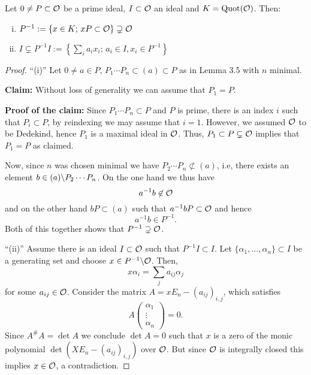 \begin{Lem}
	Let $0 \neq P \subset \mathcal{O}$ be a prime ideal, $I \subset \mathcal{O}$ an ideal and $K=\operatorname{Quot}(\mathcal{O})$. Then:
	\begin{enumerate}[(i)]
		\item $P^{-1} := \{ x \in K; \, xP \subset \mathcal{O} \} \supsetneq \mathcal{O} $
		\item $ I \subsetneq P^{-1} I := \left\{  \sum_i a_ix_i; \, a_i \in I, x_i \in P^{-1}  \right\}$
	\end{enumerate}
\end{Lem}

\begin{proof}
	\enquote{(i)} Let $0 \neq a \in P$, $P_1 \cdots P_n \subset (a) \subset P$ as in Lemma 3.5 with $n$ minimal.
	

	\bigskip
	\textbf{Claim:} Without loss of generality we can assume that $P_1 =P$.
	
	\textbf{Proof of the claim:}
	Since $P_1 \cdots P_n \subset P$ and $P$ is prime, there is an index $i$ such that $P_i \subset P$, by reindexing we may assume that $i=1$.
	However, we assumed $\mathcal{O}$ to be Dedekind, hence $P_1$ is a maximal ideal in $\mathcal{O}$. Thus,  $P_1 \subset P \subsetneq \mathcal{O}$ implies that $P_1 = P$ as claimed.
	
	\bigskip
	Now, since $n$ was chosen minimal we have $P_2 \cdots P_n \not\subset (a)$, i.e, there exists an element $b \in (a) \backslash P_2 \cdots P_n$. On the one hand we thus have
	\[ a^{-1} b \not \in \mathcal{O}
	\]
	and on the other hand $bP \subset (a)$ such that $a^{-1}bP \subset \mathcal{O}$ and hence
	\[ a^{-1} b \in P^{-1}.
	\]
	Both of this together shows that $P^{-1} \supsetneq \mathcal{O}$.
	
	\bigskip \enquote{(ii)} Assume there is an ideal $I \subset \mathcal{O}$ such that $P^{-1} I \subset I$. Let $\{\alpha_1, \dots, \alpha_n \} \subset I$ be a generating set and choose $x \in P^{-1} \backslash \mathcal{O}$. Then,
	\[ x \alpha_i = \sum_j a_{ij} \alpha_j
	\]
	for some $a_{ij} \in \mathcal{O}$. Consider the matrix $A=  xE_n - \left( a_{ij}\right)_{i,j}$, which satisfies
	\[ A \begin{pmatrix}
	\alpha_1 \\ \vdots \\ \alpha_n
	\end{pmatrix}
	= 0.
	\]
	Since $A^\#A = \det A$ we conclude $\det A =0$ such that $x$ is a zero of the monic polynomial $\det \left(  XE_n - \left( a_{ij}\right)_{i,j} \right)$ over $\mathcal{O}$. But since $\mathcal{O}$ is integrally closed this implies $x \in \mathcal{O}$, a contradiction.
\end{proof}


